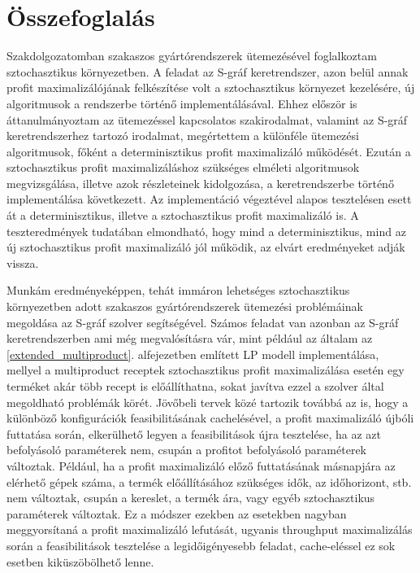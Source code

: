 \chapter{Összefoglalás} \label{Summary}
Szakdolgozatomban szakaszos gyártórendszerek ütemezésével foglalkoztam sztochasztikus környezetben.
A feladat az S-gráf keretrendszer, azon belül annak profit maximalizálójának felkészítése volt a sztochasztikus környezet kezelésére, új algoritmusok a rendszerbe történő implementálásával.
Ehhez először is áttanulmányoztam az ütemezéssel kapcsolatos szakirodalmat, valamint az S-gráf keretrendszerhez tartozó irodalmat, megértettem a különféle ütemezési algoritmusok, főként a determinisztikus profit maximalizáló működését.
Ezután a sztochasztikus profit maximalizáláshoz szükséges elméleti algoritmusok megvizsgálása, illetve azok részleteinek kidolgozása, a keretrendszerbe történő implementálása következett.
Az implementáció végeztével alapos tesztelésen esett át a determinisztikus, illetve a sztochasztikus profit maximalizáló is.
A teszteredmények tudatában elmondható, hogy mind a determinisztikus, mind az új sztochasztikus profit maximalizáló jól működik, az elvárt eredményeket adják vissza.
 
Munkám eredményeképpen, tehát immáron lehetséges sztochasztikus környezetben adott szakaszos gyártórendszerek ütemezési problémáinak megoldása az S-gráf szolver segítségével.
Számos feladat van azonban az S-gráf keretrendszerben ami még megvalósításra vár, mint például az általam az \ref{extended_multiproduct}. alfejezetben említett LP modell implementálása, mellyel a multiproduct receptek sztochasztikus profit maximalizálása esetén egy terméket akár több recept is előállíthatna, sokat javítva ezzel a szolver által megoldható problémák körét.
Jövőbeli tervek közé tartozik továbbá az is, hogy a különböző konfigurációk feasibilitásának cachelésével, a profit maximalizáló újbóli futtatása során, elkerülhető legyen a feasibilitások újra tesztelése, ha az azt befolyásoló paraméterek nem, csupán a profitot befolyásoló paraméterek változtak.
Például, ha a profit maximalizáló előző futtatásának másnapjára az elérhető gépek száma, a termék előállításához szükséges idők, az időhorizont, stb. nem változtak, csupán a kereslet, a termék ára, vagy egyéb sztochasztikus paraméterek változtak.
Ez a módszer ezekben az esetekben nagyban meggyorsítaná a profit maximalizáló lefutását, ugyanis throughput maximalizálás során a feasibilitások tesztelése a legidőigényesebb feladat, cache-eléssel ez sok esetben kiküszöbölhető lenne.